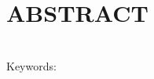 \newpage
\thispagestyle{empty}
\section*{\centering ABSTRACT}
\vspace{1cm}
\singlespacing
\tituloabstract
\bigskip

{\onehalfspacing
\hspace*{-0.8cm}\resumoEng \\
\vfill
\hspace*{-0.6cm}Keywords: \keywordsEng
}
